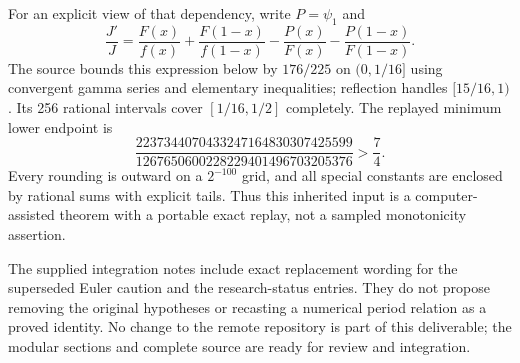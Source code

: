 \documentclass[11pt,letterpaper]{article}
\theoremstyle{definition}
\theoremstyle{remark}
\begin{document}
For an explicit view of that dependency, write $P=\psi_1$ and
\[
 \frac{J'}J=
 \frac{F(x)}{f(x)}+\frac{F(1-x)}{f(1-x)}
 -\frac{P(x)}{F(x)}-\frac{P(1-x)}{F(1-x)}.
\]
The source bounds this expression below by $176/225$ on
$(0,1/16]$ using convergent gamma series and elementary inequalities;
reflection handles $[15/16,1)$. Its 256 rational intervals cover
$[1/16,1/2]$ completely. The replayed minimum lower endpoint is
\[
 \frac{2237344070433247164830307425599}
      {1267650600228229401496703205376}>\frac74.
\]
Every rounding is outward on a $2^{-100}$ grid, and all special constants
are enclosed by rational sums with explicit tails. Thus this inherited
input is a computer-assisted theorem with a portable exact replay,
not a sampled monotonicity assertion.

The supplied integration notes include exact replacement wording for
the superseded Euler caution and the research-status entries. They do
not propose removing the original hypotheses or recasting a numerical
period relation as a proved identity. No change to the remote repository
is part of this deliverable; the modular sections and complete source
are ready for review and integration.
\end{document}
